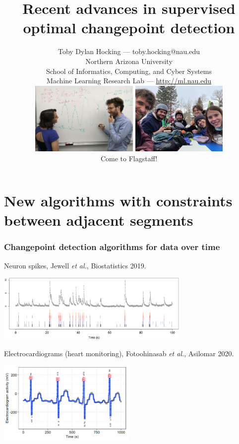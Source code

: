 \documentclass{beamer}
\begin{document}
\title{Recent advances in supervised optimal changepoint detection}

\author{
  Toby Dylan Hocking --- toby.hocking@nau.edu\\ 
  Northern Arizona University\\
  School of Informatics, Computing, and Cyber Systems\\
  Machine Learning Research Lab --- \url{http://ml.nau.edu}\\
  \includegraphics[height=3.5cm]{photo-atiyeh-whiteboard}
  \includegraphics[height=3.5cm]{2021-03-lab-ski-lunch} \\
  Come to Flagstaff! 
}

\date{}

\maketitle

\section{New algorithms with constraints between adjacent segments}
\begin{frame}
  \frametitle{Changepoint detection algorithms for data over time}
  Neuron spikes, Jewell \emph{et al.}, Biostatistics 2019.

  \includegraphics[width=0.7\textwidth]{intro-neuroscience} 

  Electrocardiograms (heart monitoring), 
  Fotoohinasab \emph{et al.}, 
  Asilomar 2020.

  \includegraphics[width=0.5\textwidth]{intro-ecg} 

\end{frame}
\end{document}
